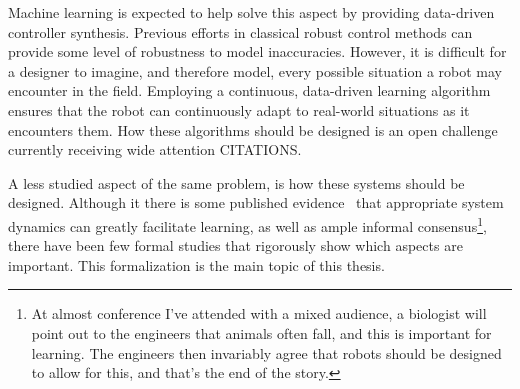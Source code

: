 Machine learning is expected to help solve this aspect by providing data-driven controller synthesis. Previous efforts in classical robust control methods can provide some level of robustness to model inaccuracies. However, it is difficult for a designer to imagine, and therefore model, every possible situation a robot may encounter in the field. Employing a continuous, data-driven learning algorithm ensures that the robot can continuously adapt to real-world situations as it encounters them. How these algorithms should be designed is an open challenge currently receiving wide attention CITATIONS. \par

A less studied aspect of the same problem, is how these systems should be designed. Although it there is some published evidence~\cite{tedrake2005learning, randlov2000shaping} that appropriate system dynamics can greatly facilitate learning, as well as ample informal consensus\footnote{At almost conference I've attended with a mixed audience, a biologist will point out to the engineers that animals often fall, and this is important for learning. The engineers then invariably agree that robots should be designed to allow for this, and that's the end of the story.}, there have been few formal studies that rigorously show which aspects are important. This formalization is the main topic of this thesis.

